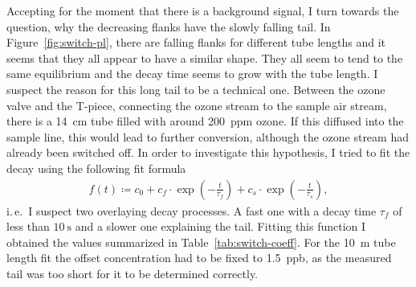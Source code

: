 Accepting for the moment that there is a background  signal, I
turn towards the question, why the decreasing flanks have the slowly
falling tail. In Figure~\ref{fig:switch-pl}, there are falling flanks
for different tube lengths and it seems that they all appear to
have a similar shape. They all seem to tend to the same equilibrium
and the decay time seems to grow with the tube length. I suspect the
reason for this long tail to be a technical one. Between the ozone
valve and the T-piece, connecting the ozone stream to the sample air
stream, there is a \SI{14}{\centi\meter} tube filled with around
\SI{200}{ppm} ozone. If this diffused into the sample line, this would
lead to further  conversion, although the ozone stream had
already been switched off. In order to investigate this hypothesis, I
tried to fit the decay using the following fit formula
\begin{align}
  f(t) \coloneqq c_0 + c_f \cdot\exp\left( -\frac{t}{\tau_f}\right) +
  c_s \cdot \exp\left(-\frac{t}{\tau_s}\right), \label{eq:switch-fit}
\end{align}
i.\,e.\ I suspect two overlaying decay processes. A fast one with a
decay time $\tau_f$ of less than $\SI{10}{\second}$ and a slower one
explaining the tail. Fitting this function I obtained the values
summarized in Table~\ref{tab:switch-coeff}. For the \SI{10}{\meter}
tube length fit the offset concentration had to be fixed to
\SI{1.5}{ppb}, as the measured tail was too short for it to be
determined correctly.

